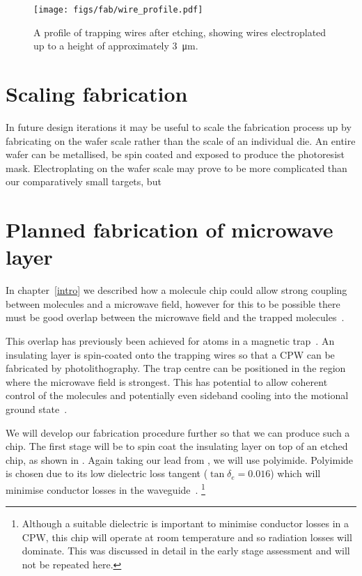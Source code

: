 \begin{figure}
\centering
  \texttt{[image: figs/fab/wire\_profile.pdf]}
  \caption{A profile of trapping wires after etching, showing wires
  electroplated up to a height of approximately \SI{3}{\micro\meter}.
  }
  \label{fab:fig:endprofile}
\end{figure}

\section{Scaling fabrication}

In future design iterations it may be useful to scale the fabrication process
up by fabricating on the wafer scale rather than the scale of an individual
die. An entire wafer can be metallised, be spin coated and exposed to
produce the photoresist mask. Electroplating on the wafer scale may prove to be
more complicated than our comparatively small targets, but 

\section{Planned fabrication of microwave layer}
\label{fab:planned}

In chapter~\ref{intro} 
we described how a molecule chip could allow strong coupling between \CaF{}
molecules and a microwave field, however for this to be possible there must be
good overlap between the microwave field and the trapped
molecules~\cite{Andre2006}.
%

This overlap has previously been achieved for atoms in a magnetic
trap~\cite{Treutlein2008}. An insulating layer is spin-coated onto the trapping
wires so that a CPW  can be fabricated by
photolithography. The trap centre can be positioned in the region where the
microwave field is strongest. This has potential to allow coherent control of
the molecules and potentially even sideband cooling into the motional ground
state~\cite{Andre2006}.
%

We will develop our fabrication procedure further so that we can produce such a
chip. The first stage will be to spin coat the insulating layer on top of an
etched chip, as shown in . Again taking our lead
from , we will use polyimide. Polyimide is chosen due
to its low dielectric loss tangent ($\tan\delta_e = 0.016$) which will minimise
conductor losses in the waveguide~\cite{Collin2007, Simons2004}.
\footnote{Although a suitable dielectric is
important to minimise conductor losses in a CPW, this chip will operate at room
temperature and so radiation losses will dominate. This was discussed in detail
in the early stage assessment and will not be repeated here.}
%

